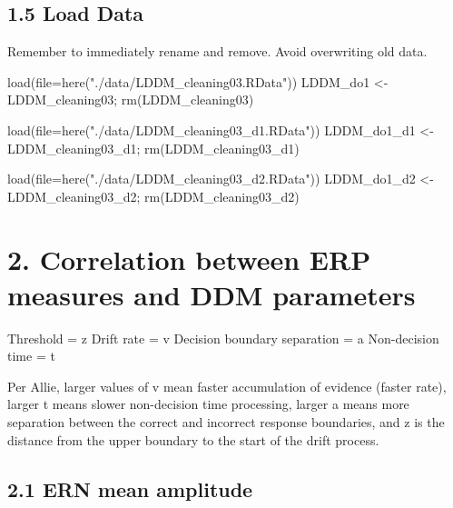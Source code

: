 \documentclass[
]{article}
\newenvironment{Shaded}{\begin{snugshade}}{\end{snugshade}}
\newcommand{\AttributeTok}[1]{\textcolor[rgb]{0.77,0.63,0.00}{#1}}
\newcommand{\FunctionTok}[1]{\textcolor[rgb]{0.00,0.00,0.00}{#1}}
\newcommand{\NormalTok}[1]{#1}
\newcommand{\OtherTok}[1]{\textcolor[rgb]{0.56,0.35,0.01}{#1}}
\newcommand{\StringTok}[1]{\textcolor[rgb]{0.31,0.60,0.02}{#1}}
\begin{document}
\hypertarget{load-data}{%
\subsection{1.5 Load Data}\label{load-data}}

Remember to immediately rename and remove. Avoid overwriting old data.

\begin{Shaded}
\begin{Highlighting}[]
\FunctionTok{load}\NormalTok{(}\AttributeTok{file=}\FunctionTok{here}\NormalTok{(}\StringTok{"./data/LDDM\_cleaning03.RData"}\NormalTok{))}
\NormalTok{LDDM\_do1 }\OtherTok{\textless{}{-}}\NormalTok{ LDDM\_cleaning03; }\FunctionTok{rm}\NormalTok{(LDDM\_cleaning03)}

\FunctionTok{load}\NormalTok{(}\AttributeTok{file=}\FunctionTok{here}\NormalTok{(}\StringTok{"./data/LDDM\_cleaning03\_d1.RData"}\NormalTok{))}
\NormalTok{LDDM\_do1\_d1 }\OtherTok{\textless{}{-}}\NormalTok{ LDDM\_cleaning03\_d1; }\FunctionTok{rm}\NormalTok{(LDDM\_cleaning03\_d1)}

\FunctionTok{load}\NormalTok{(}\AttributeTok{file=}\FunctionTok{here}\NormalTok{(}\StringTok{"./data/LDDM\_cleaning03\_d2.RData"}\NormalTok{))}
\NormalTok{LDDM\_do1\_d2 }\OtherTok{\textless{}{-}}\NormalTok{ LDDM\_cleaning03\_d2; }\FunctionTok{rm}\NormalTok{(LDDM\_cleaning03\_d2)}
\end{Highlighting}
\end{Shaded}

\hypertarget{correlation-between-erp-measures-and-ddm-parameters}{%
\section{2. Correlation between ERP measures and DDM
parameters}\label{correlation-between-erp-measures-and-ddm-parameters}}

Threshold = z Drift rate = v Decision boundary separation = a
Non-decision time = t

Per Allie, larger values of v mean faster accumulation of evidence
(faster rate), larger t means slower non-decision time processing,
larger a means more separation between the correct and incorrect
response boundaries, and z is the distance from the upper boundary to
the start of the drift process.

\hypertarget{ern-mean-amplitude}{%
\subsection{2.1 ERN mean amplitude}\label{ern-mean-amplitude}}
\end{document}

